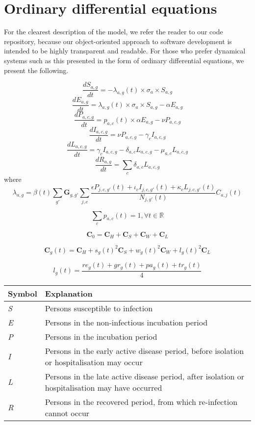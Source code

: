 
\section{Ordinary differential equations}

For the clearest description of the model, we refer the reader to our code repository, because our object-oriented approach to software development is intended to be highly transparent and readable. For those who prefer dynamical systems such as this presented in the form of ordinary differential equations, we present the following.

\[\frac{dS_{a,g}}{dt}=-\lambda_{a,g}(t)\times\sigma_{a}\times S_{a,g}\]
\[\frac{dE_{a,g}}{dt}=\lambda_{a,g}(t)\times\sigma_{a}\times S_{a,g}-\alpha E_{a,g}\]
\[\frac{dP_{a,c,g}}{dt}=p_{a,c}(t)\times \alpha E_{a,g}-\nu P_{a,c,g}\]
\[\frac{dI_{a,c,g}}{dt}=\nu P_{a,c,g}-\gamma_{c}I_{a,c,g}\]
\[\frac{dL_{a,c,g}}{dt}=\gamma_{c}I_{a,c,g}-\delta_{a,c}L_{a,c,g}-\mu_{a,c}L_{a,c,g}\]
\[\frac{dR_{a,g}}{dt}=\sum_{c}{}\delta_{a,c}L_{a,c,g}\]
where
\[\lambda_{a,g}=\beta(t)\sum_{g'}\textbf{G}_{g,g'} \sum_{j,c}\frac{\epsilon P_{j,c,g'}(t)+\iota_{c}I_{j,c,g'}(t)+\kappa_{c}L_{j,c,g'}(t)}{N_{j,g'}(t)} C_{a,j}(t)\]

\[\sum_{c}p_{a,c}(t)=1,\forall t\in\mathbb{R}\]

\[\textbf{C}_{0}=\textbf{C}_{H}+\textbf{C}_{S}+\textbf{C}_{W}+\textbf{C}_{L}\]

\[\textbf{C}_{g}(t)=\textbf{C}_{H}+s_{g}(t)^{2}\textbf{C}_{S}+w_{g}(t)^{2}\textbf{C}_{W}+l_{g}(t)^{2}\textbf{C}_{L}\]

\[l_{g}(t)=\frac{re_{g}(t)+gr_{g}(t)+pa_{g}(t)+tr_{g}(t)}{4}\]

\begin{table}[ht]
\renewcommand{\baselinestretch}{1}
    	\begin{tabular}{| p{2cm} | p{11.1cm} |}
    	\hline
    		Symbol & Explanation \\
	    	\hline
	    	\textit{S} & Persons susceptible to infection \\
    		\textit{E} & Persons in the non-infectious incubation period \\
    		\textit{P} & Persons in the incubation period \\
    		\textit{I} & Persons in the early active disease period, before isolation or hospitalisation may occur \\
    		\textit{L} & Persons in the late active disease period, after isolation or hospitalisation may have occurred \\
    		\textit{R} & Persons in the recovered period, from which re-infection cannot occur \\
    		\hline
	\end{tabular}
\end{table}


